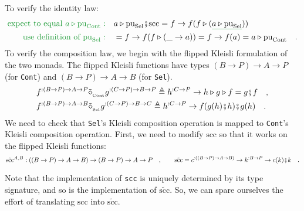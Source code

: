 To verify the identity law:
\begin{align*}
{\color{greenunder}\text{expect to equal }a\triangleright\text{pu}_{\text{Cont}}:}\quad & a\triangleright\text{pu}_{\text{Sel}}\bef\text{scc}=f\rightarrow f(f\triangleright(\gunderline{a\triangleright\text{pu}_{\text{Sel}}}))\\
{\color{greenunder}\text{use definition of }\text{pu}_{\text{Sel}}:}\quad & =f\rightarrow f(f\triangleright(\_\rightarrow a))=f\rightarrow f(a)=a\triangleright\text{pu}_{\text{Cont}}\quad.
\end{align*}
To verify the composition law, we begin with the flipped Kleisli formulation
of the two monads. The flipped Kleisli functions have types $\left(B\rightarrow P\right)\rightarrow A\rightarrow P$
(for \lstinline!Cont!) and $\left(B\rightarrow P\right)\rightarrow A\rightarrow B$
(for \lstinline!Sel!).
\begin{align*}
 & f^{:\left(B\rightarrow P\right)\rightarrow A\rightarrow P}\tilde{\diamond}_{_{\text{Cont}}}g^{:\left(C\rightarrow P\right)\rightarrow B\rightarrow P}\triangleq h^{:C\rightarrow P}\rightarrow h\triangleright g\triangleright f=g\bef f\quad,\\
 & f^{:\left(B\rightarrow P\right)\rightarrow A\rightarrow B}\tilde{\diamond}_{_{\text{Sel}}}g^{:\left(C\rightarrow P\right)\rightarrow B\rightarrow C}\triangleq h^{:C\rightarrow P}\rightarrow f(g(h)\bef h)\bef g(h)\quad.
\end{align*}
We need to check that \lstinline!Sel!\textsf{'}s Kleisli composition operation
is mapped to \lstinline!Cont!\textsf{'}s Kleisli composition operation. First,
we need to modify $\text{scc}$ so that it works on the flipped Kleisli
functions:
\[
\tilde{\text{scc}}^{A,B}:\left(\left(B\rightarrow P\right)\rightarrow A\rightarrow B\right)\rightarrow\left(B\rightarrow P\right)\rightarrow A\rightarrow P\quad,\quad\quad\tilde{\text{scc}}=c^{:\left(\left(B\rightarrow P\right)\rightarrow A\rightarrow B\right)}\rightarrow k^{:B\rightarrow P}\rightarrow c(k)\bef k\quad.
\]

Note that the implementation of \lstinline!scc! is uniquely determined
by its type signature, and so is the implementation of $\tilde{\text{scc}}$.
So, we can spare ourselves the effort of translating $\text{scc}$
into $\tilde{\text{scc}}$.

